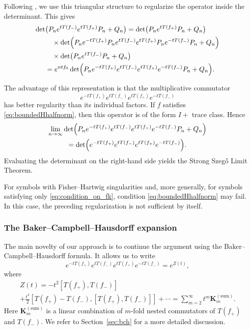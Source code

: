 \documentclass[11pt]{amsart}
\theoremstyle{plain}
\theoremstyle{remark}
\numberwithin{equation}{section}
\begin{document}
Following \cite{BasHelt}, we use this triangular structure to regularize the
operator inside the determinant. This gives
\begin{align}
\det&\bigl(P_ne^{tT(f_-)}e^{tT(f_+)}P_n+Q_n\bigr)
=
\det\bigl(P_ne^{tT(f_+)}P_n+Q_n\bigr)
\nonumber\\
&\quad\times
\det\Bigl(
P_ne^{-tT(f_+)}P_ne^{tT(f_-)}e^{tT(f_+)}
P_ne^{-tT(f_-)}P_n+Q_n
\Bigr)
\nonumber\\
&\quad\times
\det\bigl(P_ne^{tT(f_-)}P_n+Q_n\bigr)
\nonumber\\
&=
e^{ntf_0}
\det\Bigl(
P_ne^{-tT(f_+)}e^{tT(f_-)}e^{tT(f_+)}
e^{-tT(f_-)}P_n+Q_n
\Bigr).
\label{eqn:studied_fredholm}
\end{align}

The advantage of this representation is that the multiplicative commutator
\[
e^{-tT(f_+)}e^{tT(f_-)}e^{tT(f_+)}e^{-tT(f_-)}
\]
has better regularity than its individual factors. If $f$ satisfies
\eqref{eq:boundedHhalfnorm}, then this operator is of the form $I+$ trace
class. Hence
\begin{multline}
\lim_{n\to\infty}
\det\Bigl(
P_ne^{-tT(f_+)}e^{tT(f_-)}e^{tT(f_+)}
e^{-tT(f_-)}P_n+Q_n
\Bigr)
\\
=
\det\Bigl(
e^{-tT(f_+)}e^{tT(f_-)}e^{tT(f_+)}e^{-tT(f_-)}
\Bigr).
\end{multline}
Evaluating the determinant on the right-hand side yields the Strong
Szeg\H{o} Limit Theorem.

For symbols with Fisher--Hartwig singularities and, more generally, for symbols
satisfying only \eqref{eq:condition_on_fk}, condition
\eqref{eq:boundedHhalfnorm} may fail. In this case, the preceding
regularization is not sufficient by itself.

\subsubsection{The Baker--Campbell--Hausdorff expansion}

The main novelty of our approach is to continue the argument using the
Baker--Campbell--Hausdorff formula. It allows us to write
\begin{equation}\label{eqn:ztconcrete}
e^{-tT(f_+)}e^{tT(f_-)}e^{tT(f_+)}e^{-tT(f_-)}
=
e^{Z(t)},
\end{equation}
where
\begin{multline}\label{eqn:qualitative_BCH}
Z(t)
=
-t^2[T(f_+),T(f_-)]
\\
+\frac{t^3}{2}
[T(f_+)-T(f_-),[T(f_+),T(f_-)]]
+\cdots
=
\sum_{m=2}^{\infty}t^m\mathbf{K}_m^{\mathrm{(sum)}}.
\end{multline}
Here $\mathbf{K}_m^{\mathrm{(sum)}}$ is a linear combination of $m$-fold
nested commutators of $T(f_+)$ and $T(f_-)$. We refer to
Section~\ref{sec:bch} for a more detailed discussion.
\end{document}
